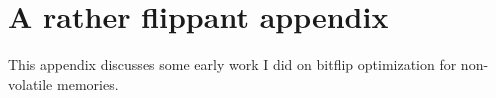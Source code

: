 
\chapter{A rather flippant appendix}\label{app:bitflip}

\begin{chabstract}
    This appendix discusses some early work I did on bitflip optimization for non-volatile memories.
\end{chabstract}


\newcommand{\gem}{Gem5\xspace}
\newcommand{\malloc}{\texttt{malloc}\xspace}
















